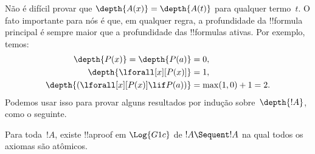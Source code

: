 \documentclass[../../../include/open-logic-section]{subfiles}
\begin{document}
Não é difícil provar que $\depth{A(x)} = \depth{A(t)}$ para qualquer
termo~$t$. O fato importante para nós é que, em qualquer regra, a profundidade
da !!{formula} principal é sempre maior que a profundidade das
!!{formula}s ativas. Por exemplo, temos:
\begin{align*}
\depth{P(x)} = \depth{P(a)} & = 0,\\
\depth{\lforall[x][P(x)]} & = 1,\\
\depth{(\lforall[x][P(x)] \lif P(a))} & = \max(1,0) + 1 = 2.
\end{align*}
Podemos usar isso para provar alguns resultados por indução sobre~$\depth{!A}$,
como o seguinte.

\begin{prop}
Para toda~$!A$, existe !!a{proof} em $\Log{G1c}$ de $!A \Sequent !A$
na qual todos os axiomas são atômicos.
\end{prop}
\end{document}
